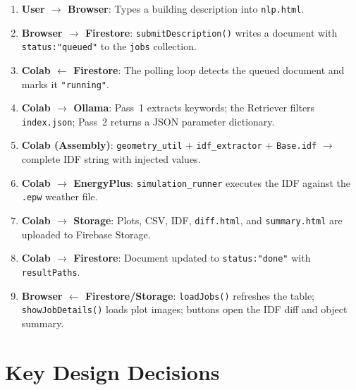 \documentclass[12pt, a4paper]{article}
\begin{document}
\begin{enumerate}[nosep]
  \item \textbf{User $\to$ Browser}: Types a building description into \texttt{nlp.html}.
  \item \textbf{Browser $\to$ Firestore}: \texttt{submitDescription()} writes a document with \texttt{status:"queued"} to the \texttt{jobs} collection.
  \item \textbf{Colab $\leftarrow$ Firestore}: The polling loop detects the queued document and marks it \texttt{"running"}.
  \item \textbf{Colab $\to$ Ollama}: Pass~1 extracts keywords; the Retriever filters \texttt{index.json}; Pass~2 returns a JSON parameter dictionary.
  \item \textbf{Colab (Assembly)}: \texttt{geometry\_util} + \texttt{idf\_extractor} + \texttt{Base.idf} $\to$ complete IDF string with injected values.
  \item \textbf{Colab $\to$ EnergyPlus}: \texttt{simulation\_runner} executes the IDF against the \texttt{.epw} weather file.
  \item \textbf{Colab $\to$ Storage}: Plots, CSV, IDF, \texttt{diff.html}, and \texttt{summary.html} are uploaded to Firebase Storage.
  \item \textbf{Colab $\to$ Firestore}: Document updated to \texttt{status:"done"} with \texttt{resultPaths}.
  \item \textbf{Browser $\leftarrow$ Firestore/Storage}: \texttt{loadJobs()} refreshes the table; \texttt{showJobDetails()} loads plot images; buttons open the IDF diff and object summary.
\end{enumerate}

\section{Key Design Decisions}
\end{document}
